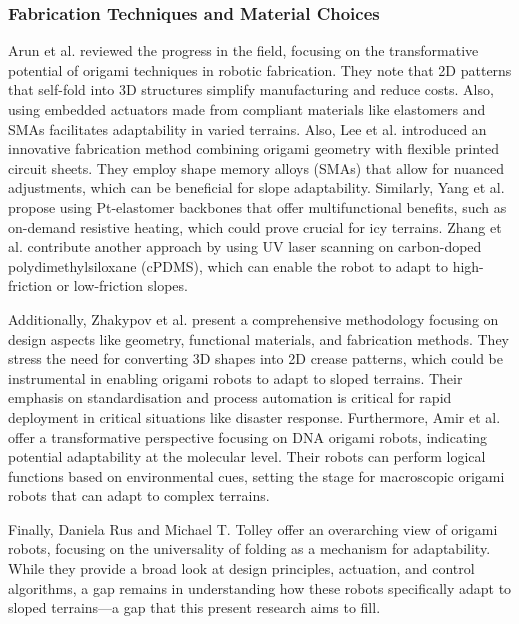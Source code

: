 \documentclass{sigchi}
\begin{document}
\subsubsection{Fabrication Techniques and Material Choices}
Arun et al. reviewed the progress in the field, focusing on the transformative potential of origami techniques in robotic fabrication. They note that 2D patterns that self-fold into 3D structures simplify manufacturing and reduce costs. Also, using embedded actuators made from compliant materials like elastomers and SMAs facilitates adaptability in varied terrains\cite{s_b_advancements_2019}. Also, Lee et al. introduced an innovative fabrication method combining origami geometry with flexible printed circuit sheets. They employ shape memory alloys (SMAs) that allow for nuanced adjustments, which can be beneficial for slope adaptability\cite{lee_origami_2018}. Similarly, Yang et al. propose using Pt-elastomer backbones that offer multifunctional benefits, such as on-demand resistive heating, which could prove crucial for icy terrains\cite{yang_multifunctional_2019}. Zhang et al. contribute another approach by using UV laser scanning on carbon-doped polydimethylsiloxane (cPDMS), which can enable the robot to adapt to high-friction or low-friction slopes\cite{zhang_programmable_2021}.


Additionally, Zhakypov et al. present a comprehensive methodology focusing on design aspects like geometry, functional materials, and fabrication methods. They stress the need for converting 3D shapes into 2D crease patterns, which could be instrumental in enabling origami robots to adapt to sloped terrains. Their emphasis on standardisation and process automation is critical for rapid deployment in critical situations like disaster response\cite{zhakypov_design_2018}. Furthermore, Amir et al. offer a transformative perspective focusing on DNA origami robots, indicating potential adaptability at the molecular level. Their robots can perform logical functions based on environmental cues, setting the stage for macroscopic origami robots that can adapt to complex terrains\cite{amir_universal_2014}.

Finally, Daniela Rus and Michael T. Tolley offer an overarching view of origami robots, focusing on the universality of folding as a mechanism for adaptability\cite{rus_design_2018}. While they provide a broad look at design principles, actuation, and control algorithms, a gap remains in understanding how these robots specifically adapt to sloped terrains—a gap that this present research aims to fill.
\end{document}
